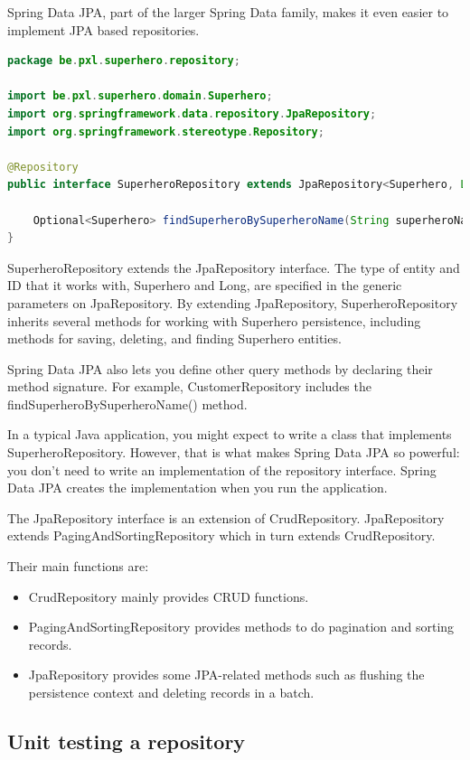 Spring Data JPA, part of the larger Spring Data family, makes it even easier to implement JPA based repositories.


\begin{lstlisting}[frame=single, language=java]
package be.pxl.superhero.repository;

import be.pxl.superhero.domain.Superhero;
import org.springframework.data.repository.JpaRepository;
import org.springframework.stereotype.Repository;

@Repository
public interface SuperheroRepository extends JpaRepository<Superhero, Long> {

	Optional<Superhero> findSuperheroBySuperheroName(String superheroName);
}
\end{lstlisting}

SuperheroRepository extends the JpaRepository interface. The type of entity and ID that it works with, Superhero and Long, are specified in the generic parameters on JpaRepository. By extending JpaRepository, SuperheroRepository inherits several methods for working with Superhero persistence, including methods for saving, deleting, and finding Superhero entities.

Spring Data JPA also lets you define other query methods by declaring their method signature. For example, CustomerRepository includes the findSuperheroBySuperheroName() method.

In a typical Java application, you might expect to write a class that implements SuperheroRepository. However, that is what makes Spring Data JPA so powerful: you don't need to write an implementation of the repository interface. Spring Data JPA creates the implementation when you run the application.

The JpaRepository interface is an extension of CrudRepository.
JpaRepository extends PagingAndSortingRepository which in turn extends CrudRepository.

Their main functions are:

\begin{itemize}
\item CrudRepository mainly provides CRUD functions.
\item PagingAndSortingRepository provides methods to do pagination and sorting records.
\item JpaRepository provides some JPA-related methods such as flushing the persistence context and deleting records in a batch.
\end{itemize}

\subsection{Unit testing a repository}

